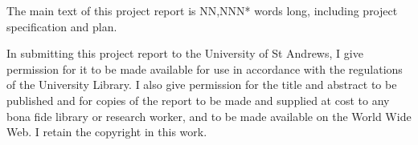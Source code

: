 \documentclass[]{report}
\begin{document}
    The main text of this project report is  NN,NNN* words long, including project specification and plan.

    In submitting this project report to the University of
    St Andrews, I give permission for it to be made
    available for use in accordance with the regulations of
    the University Library. I also give permission for
    the title and abstract to be published and for copies of
    the report to be made and supplied at cost to any bona
    fide library or research worker, and to be made
    available on the World Wide Web. I retain the
    copyright in this work.

\listoftodos












\nocite{*}
\printbibliography
\end{document}
